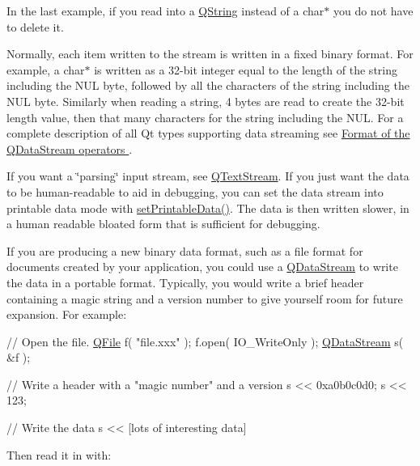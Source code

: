 In the last example, if you read into a \hyperlink{class_q_string}{Q\-String} instead of a {\ttfamily char$\ast$} you do not have to delete it.

Normally, each item written to the stream is written in a fixed binary format. For example, a {\ttfamily char$\ast$} is written as a 32-\/bit integer equal to the length of the string including the N\-U\-L byte, followed by all the characters of the string including the N\-U\-L byte. Similarly when reading a string, 4 bytes are read to create the 32-\/bit length value, then that many characters for the string including the N\-U\-L. For a complete description of all Qt types supporting data streaming see \hyperlink{}{Format of the Q\-Data\-Stream operators } .

If you want a \char`\"{}parsing\char`\"{} input stream, see \hyperlink{class_q_text_stream}{Q\-Text\-Stream}. If you just want the data to be human-\/readable to aid in debugging, you can set the data stream into printable data mode with \hyperlink{class_q_data_stream_a52c59e5985c0651783e12f7e3edcffe7}{set\-Printable\-Data()}. The data is then written slower, in a human readable bloated form that is sufficient for debugging.

If you are producing a new binary data format, such as a file format for documents created by your application, you could use a \hyperlink{class_q_data_stream}{Q\-Data\-Stream} to write the data in a portable format. Typically, you would write a brief header containing a magic string and a version number to give yourself room for future expansion. For example\-:


\begin{DoxyCode}
\textcolor{comment}{// Open the file.}
\hyperlink{class_q_file}{QFile} f( \textcolor{stringliteral}{"file.xxx"} );
f.open( IO\_WriteOnly );
\hyperlink{class_q_data_stream}{QDataStream} s( &f );

\textcolor{comment}{// Write a header with a "magic number" and a version}
s << 0xa0b0c0d0;
s << 123;

\textcolor{comment}{// Write the data}
s << [lots of interesting data]
\end{DoxyCode}


Then read it in with\-:


